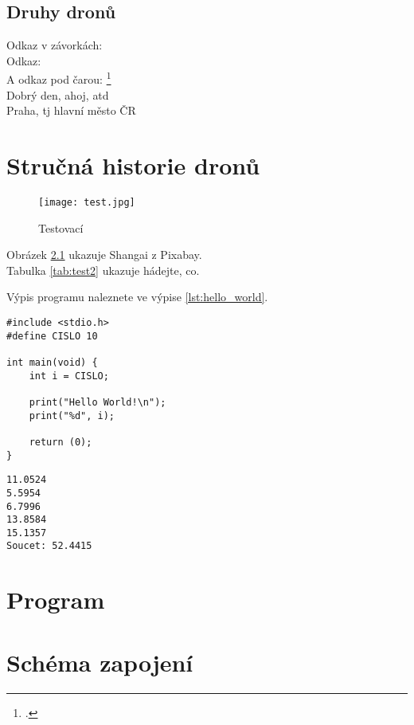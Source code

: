 \documentclass[12pt]{report}
\begin{document}
\lipsum[1]	

\section{Druhy dronů}
	Odkaz v závorkách: \parencite[see][page 900]{einstein}\\
	Odkaz: \cite{knuthwebsite}\\
	A odkaz pod čarou: \footcite[see][s. 42]{latexcompanion}\\
	Dobrý den, ahoj, \gls{atd}\\
	Praha, \gls{tj} hlavní město ČR
	



\chapter[Stručná historie dronů]{Stručná historie dronů}
\begin{figure}
  \texttt{[image: test.jpg]}
  \caption{Testovací}
  \label{fig:test}
\end{figure}
Obrázek \ref{fig:test} ukazuje Shangai z Pixabay.\\
Tabulka \ref{tab:test2} ukazuje hádejte, co.
	
\lipsum[3]


Výpis programu   naleznete ve výpise \ref{lst:hello_world}.

\begin{lstlisting}[title={Program hello.c}, caption={hello.c}, label={lst:hello_world}]
#include <stdio.h>
#define CISLO 10

int main(void) {
	int i = CISLO;

	print("Hello World!\n");
	print("%d", i);

	return (0);
}
\end{lstlisting}

\lipsum[1]	

\begin{lstlisting}[numbers=none, title={Příklad výstupního souboru}]
11.0524
5.5954
6.7996
13.8584
15.1357
Soucet: 52.4415
\end{lstlisting}

\chapter{Program}

\lipsum[1]

\chapter{Schéma zapojení}
\end{document}
